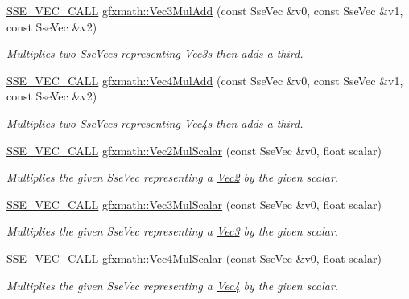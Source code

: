 \begin{DoxyCompactItemize}
\hyperlink{ssevec__math__defs_8h_a97454f977a5281455cecacce1e8ba670}{S\+S\+E\+\_\+\+V\+E\+C\+\_\+\+C\+A\+L\+L} \hyperlink{group___s_i_m_d_vec_math_ga87ae683bc9bc6226eeb0c6b219ffd03a}{gfxmath\+::\+Vec3\+Mul\+Add} (const Sse\+Vec \&v0, const Sse\+Vec \&v1, const Sse\+Vec \&v2)
\begin{DoxyCompactList}\small\item\em Multiplies two Sse\+Vecs representing Vec3s then adds a third. \end{DoxyCompactList}\item 
\hyperlink{ssevec__math__defs_8h_a97454f977a5281455cecacce1e8ba670}{S\+S\+E\+\_\+\+V\+E\+C\+\_\+\+C\+A\+L\+L} \hyperlink{group___s_i_m_d_vec_math_gaa9e5b230025c4896a419cc7c4a73b62c}{gfxmath\+::\+Vec4\+Mul\+Add} (const Sse\+Vec \&v0, const Sse\+Vec \&v1, const Sse\+Vec \&v2)
\begin{DoxyCompactList}\small\item\em Multiplies two Sse\+Vecs representing Vec4s then adds a third. \end{DoxyCompactList}\item 
\hyperlink{ssevec__math__defs_8h_a97454f977a5281455cecacce1e8ba670}{S\+S\+E\+\_\+\+V\+E\+C\+\_\+\+C\+A\+L\+L} \hyperlink{group___s_i_m_d_vec_math_ga90100e65d1b4a3217e9d0591a47d9e8f}{gfxmath\+::\+Vec2\+Mul\+Scalar} (const Sse\+Vec \&v0, float scalar)
\begin{DoxyCompactList}\small\item\em Multiplies the given Sse\+Vec representing a \hyperlink{classgfxmath_1_1_vec2}{Vec2} by the given scalar. \end{DoxyCompactList}\item 
\hyperlink{ssevec__math__defs_8h_a97454f977a5281455cecacce1e8ba670}{S\+S\+E\+\_\+\+V\+E\+C\+\_\+\+C\+A\+L\+L} \hyperlink{group___s_i_m_d_vec_math_ga2700cc382394a8a220d6ceba22c627a8}{gfxmath\+::\+Vec3\+Mul\+Scalar} (const Sse\+Vec \&v0, float scalar)
\begin{DoxyCompactList}\small\item\em Multiplies the given Sse\+Vec representing a \hyperlink{classgfxmath_1_1_vec3}{Vec3} by the given scalar. \end{DoxyCompactList}\item 
\hyperlink{ssevec__math__defs_8h_a97454f977a5281455cecacce1e8ba670}{S\+S\+E\+\_\+\+V\+E\+C\+\_\+\+C\+A\+L\+L} \hyperlink{group___s_i_m_d_vec_math_ga7a731cf65284e07919a28d6254aa21b6}{gfxmath\+::\+Vec4\+Mul\+Scalar} (const Sse\+Vec \&v0, float scalar)
\begin{DoxyCompactList}\small\item\em Multiplies the given Sse\+Vec representing a \hyperlink{classgfxmath_1_1_vec4}{Vec4} by the given scalar. \end{DoxyCompactList}\item 

\end{DoxyCompactItemize}
